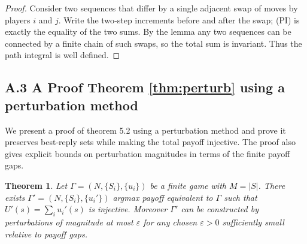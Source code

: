 \documentclass[11pt]{article}
\newtheorem{theorem}{Theorem}[section]
\begin{document}
\begin{proof}
Consider two sequences that differ by a single adjacent swap of moves by
players \(i\) and \(j\). Write the two‑step increments before and after the
swap; (PI) is exactly the equality of the two sums. By the lemma any two
sequences can be connected by a finite chain of such swaps, so the total sum
is invariant. Thus the path integral is well defined.
\end{proof}


\subsection{A.3 A Proof Theorem \ref{thm:perturb} using a perturbation method}

We present a proof of theorem 5.2 using a perturbation method  and prove it preserves
best‑reply sets while making the total payoff injective. The proof also gives
explicit bounds on perturbation magnitudes in terms of the finite payoff
gaps.

\begin{theorem}
Let \(\Gamma=(N,\{S_i\},\{u_i\})\) be a finite game with \(M=|S|\). There
exists \(\Gamma'=(N,\{S_i\},\{u_i'\})\) argmax payoff equivalent to \(\Gamma\)
such that \(U'(s)=\sum_i u_i'(s)\) is injective. Moreover \(\Gamma'\) can be
constructed by perturbations of magnitude at most \(\varepsilon\) for any
chosen \(\varepsilon>0\) sufficiently small relative to payoff gaps.
\end{theorem}
\end{document}
